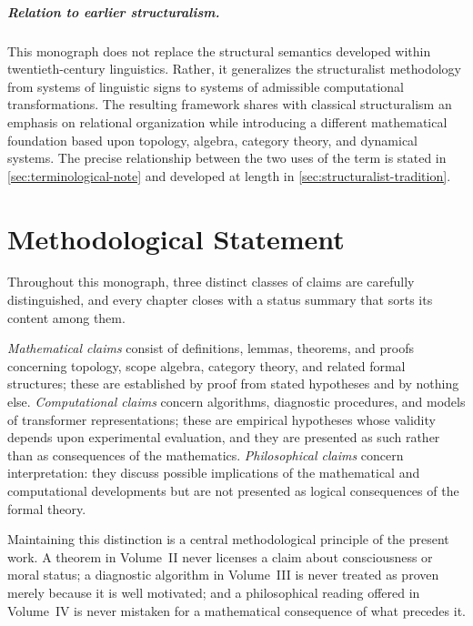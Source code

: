 \documentclass[11pt,twoside,openright]{book}
\numberwithin{equation}{chapter}
\theoremstyle{definition}
\theoremstyle{plain}
\theoremstyle{remark}
\theoremstyle{definition}
\begin{document}
\paragraph{Relation to earlier structuralism.} This monograph does not
replace the structural semantics developed within twentieth-century
linguistics. Rather, it generalizes the structuralist methodology from
systems of linguistic signs to systems of admissible computational
transformations. The resulting framework shares with classical
structuralism an emphasis on relational organization while introducing a
different mathematical foundation based upon topology, algebra, category
theory, and dynamical systems. The precise relationship between the two
uses of the term is stated in \cref{sec:terminological-note} and developed
at length in \cref{sec:structuralist-tradition}.

\chapter*{Methodological Statement}

Throughout this monograph, three distinct classes of claims are carefully
distinguished, and every chapter closes with a status summary that sorts
its content among them.

\emph{Mathematical claims} consist of definitions, lemmas, theorems, and
proofs concerning topology, scope algebra, category theory, and related
formal structures; these are established by proof from stated hypotheses
and by nothing else. \emph{Computational claims} concern algorithms,
diagnostic procedures, and models of transformer representations; these
are empirical hypotheses whose validity depends upon experimental
evaluation, and they are presented as such rather than as consequences of
the mathematics. \emph{Philosophical claims} concern interpretation: they
discuss possible implications of the mathematical and computational
developments but are not presented as logical consequences of the formal
theory.

Maintaining this distinction is a central methodological principle of the
present work. A theorem in Volume~II never licenses a claim about
consciousness or moral status; a diagnostic algorithm in Volume~III is
never treated as proven merely because it is well motivated; and a
philosophical reading offered in Volume~IV is never mistaken for a
mathematical consequence of what precedes it.
\end{document}
